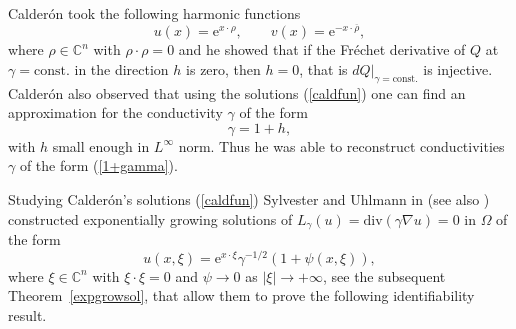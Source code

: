 \documentclass[10pt, a4paper, twoside, openright]{book}
\theoremstyle{definition}
\theoremstyle{plain}
\theoremstyle{plain}
\theoremstyle{plain}
\theoremstyle{plain}
\theoremstyle{plain}
\theoremstyle{plain}
\theoremstyle{plain}
\theoremstyle{plain}
\begin{document}
Calder\'on
took the following harmonic functions
\begin{equation}
\label{caldfun}
u(x)=\mathrm{e}^{x\cdot\rho},\qquad v(x)=\mathrm{e}^{-x\cdot\overline{\rho}},
\end{equation}
where $\rho\in\mathbb{C}^{n}$ with $\rho\cdot\rho=0$ and he
showed that if the Fr\'echet derivative of $Q$
at $\gamma=\mathrm{const.}$ in the direction $h$ is zero,
then $h=0$, that is $dQ|_{\gamma=\mathrm{const.}}$ is injective.
Calder\'on also observed that using the solutions (\ref{caldfun})
one can find an approximation for the conductivity $\gamma$ of the form
\begin{equation}
\label{1+gamma}
\gamma=1+h,
\end{equation}
with $h$ small enough in $L^{\infty}$ norm.
Thus he was able to reconstruct conductivities $\gamma$ of the form (\ref{1+gamma}).

Studying Calder\'on's solutions (\ref{caldfun}) Sylvester and Uhlmann in \cite{Sy-Uh}
(see also \cite{Sy-Uh86})
constructed exponentially growing solutions of $L_{\gamma}(u)=\mathrm{div}(\gamma\nabla u)=0$
in $\Omega$ of the form
$$u(x,\xi)=\mathrm{e}^{x\cdot\xi}\gamma^{-1/2}(1+\psi(x,\xi)),$$
where $\xi\in\mathbb{C}^n$ with $\xi\cdot\xi=0$
and $\psi\to0$ as $|\xi|\to+\infty$, see the subsequent Theorem~\ref{expgrowsol},
that allow them to prove the following identifiability result.
\end{document}
